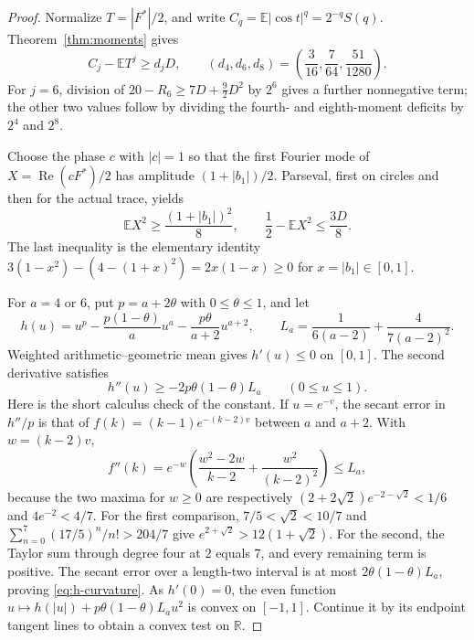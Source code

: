 \documentclass[11pt]{article}
\newcommand{\E}{\mathbb E}
\begin{document}
	\begin{proof}
		Normalize $T=|F^*|/2$, and write
		$C_q=\E|\cos t|^q=2^{-q}S(q)$.  Theorem~\ref{thm:moments} gives
		\begin{equation}\label{eq:three-normalized-deficits}
			C_j-\E T^j\ge d_jD,\qquad
			(d_4,d_6,d_8)=\left(\frac3{16},\frac7{64},\frac{51}{1280}\right).
		\end{equation}
		For $j=6$, division of $20-R_6\ge7D+\frac92D^2$ by $2^6$
		gives a further nonnegative term; the other two values follow by
		dividing the fourth- and eighth-moment deficits by $2^4$ and $2^8$.
		
		Choose the phase $c$ with $|c|=1$ so that the first Fourier mode of
		$X=\operatorname{Re}(cF^*)/2$ has amplitude $(1+|b_1|)/2$.
		Parseval, first on circles and then for the actual trace, yields
		\[
		\E X^2\ge\frac{(1+|b_1|)^2}{8},\qquad
		\frac12-\E X^2\le\frac{3D}{8}.
		\]
		The last inequality is the elementary identity
		$3(1-x^2)-(4-(1+x)^2)=2x(1-x)\ge0$ for $x=|b_1|\in[0,1]$.
		
		For $a=4$ or $6$, put $p=a+2\theta$ with $0\le\theta\le1$, and let
		\[
		h(u)=u^p-\frac{p(1-\theta)}{a}u^a
		-\frac{p\theta}{a+2}u^{a+2},\qquad
		L_a=\frac1{6(a-2)}+\frac4{7(a-2)^2}.
		\]
		Weighted arithmetic--geometric mean gives $h'(u)\le0$ on $[0,1]$.
		The second derivative satisfies
		\begin{equation}\label{eq:h-curvature}
			h''(u)\ge-2p\theta(1-\theta)L_a\qquad(0\le u\le1).
		\end{equation}
		Here is the short calculus check of the constant.  If $u=e^{-v}$,
		the secant error in $h''/p$ is that of
		$f(k)=(k-1)e^{-(k-2)v}$ between $a$ and $a+2$.
		With $w=(k-2)v$,
		\[
		f''(k)=e^{-w}\left(\frac{w^2-2w}{k-2}
		+\frac{w^2}{(k-2)^2}\right)
		\le L_a,
		\]
		because the two maxima for $w\ge0$ are respectively
		$(2+2\sqrt2)e^{-2-\sqrt2}<1/6$ and $4e^{-2}<4/7$.
		For the first comparison, \(7/5<\sqrt2<10/7\) and
		\(\sum_{n=0}^7(17/5)^n/n!>204/7\) give
		\(e^{2+\sqrt2}>12(1+\sqrt2)\).
		For the second, the Taylor sum through degree four at \(2\) equals
		\(7\), and every remaining term is positive.
		The secant error over a length-two interval is at most
		$2\theta(1-\theta)L_a$, proving \eqref{eq:h-curvature}.
		As $h'(0)=0$, the even function
		$u\mapsto h(|u|)+p\theta(1-\theta)L_a u^2$ is convex on $[-1,1]$.
		Continue it by its endpoint tangent lines to obtain a convex test
		on $\mathbb R$.
		

\end{proof}
\end{document}
